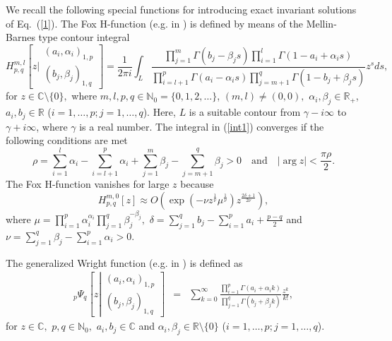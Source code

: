 \documentclass[12pt]{amsart}
\begin{document}
We recall the following special functions for introducing exact invariant solutions of Eq.~(\ref{1}). The Fox H-function (e.g. in \cite{glockle,Kiryakova,Hnom}) is defined by means of the Mellin-Barnes type contour integral
\begin{equation}
\label{int1}
H_{p,q}^{m,l}\left[z\biggr\vert\begin{array}{c}
(a_i, \alpha_i)_{1,p}\\
(b_j, \beta_j)_{1,q}
\end{array}\right]=\frac{1}{2\pi i}\int_{L}\frac{\prod\limits_{j=1}^m\Gamma(b_j-\beta_js)\prod\limits_{i=1}^l\Gamma(1-a_i+\alpha_is)}{\prod\limits_{i=l+1}^p\Gamma(a_i-\alpha_is)\prod\limits_{j=m+1}^q\Gamma(1-b_j+\beta_js)}z^{s}d s,
\end{equation}
for $z\in\mathbb{C}\setminus\{0\},$ where $m,l,p,q\in\mathbb{N}_0=\{0,1,2,\ldots\}$, $(m,l)\neq (0,0),$ $\alpha_i, \beta_j\in\mathbb{R}_+$, $a_i,b_j\in\mathbb{R}$ ($i=1,\ldots, p;j=1,\ldots,q$). Here, $L$ is a suitable contour from $\gamma-i\infty$ to $\gamma+i\infty$, where $\gamma$ is a real number. The integral in (\ref{int1}) converges if the following conditions are met 
\begin{equation*}
\rho=\sum_{i=1}^{l}\alpha_i-\sum_{i=l+1}^{p}\alpha_i+\sum_{j=1}^{m}\beta_j-\sum_{j=m+1}^{q}\beta_j>0\quad\mbox{and}\quad |\arg z|<\frac{\pi\rho}{2}. 
\end{equation*}
The Fox H-function vanishes for large $z$ because 
\begin{equation*}
\label{eq8}
H_{p,q}^{m,0}[z]\approx O\left(\exp\left(-\nu z^{\frac{1}{\nu}}\mu^{\frac{1}{\nu}}\right)z^{\frac{2\delta+1}{2\nu}}\right),
\end{equation*}
where $\mu=\prod\limits_{i=1}^p\alpha_i^{\alpha_i}\prod\limits_{j=1}^q\beta_j^{-\beta_j},$ $\delta=\sum\limits_{j=1}^q b_j-\sum\limits_{i=1}^p a_i+\frac{p-q}{2}$  and
$\nu=\sum\limits_{j=1}^{q}\beta_j-\sum\limits_{i=1}^{p}\alpha_i>0$.

The generalized Wright function (e.g. in \cite{Luchko1,kilb2005}) is defined as
\begin{eqnarray}
\label{ub3}
{}_p\Psi_q\left[z\left|\begin{array}{c}
(a_i,\alpha_i)_{1,p}\\
(b_j,\beta_j)_{1,q}
\end{array}\right.\right] & = & \sum_{k=0}^\infty\frac{\prod\limits_{i=1}^p\Gamma(a_i+\alpha_i k)}{\prod\limits_{j=1}^q\Gamma(b_j+\beta_j k)}\frac{z^k}{k!},
\end{eqnarray}
for $z\in\mathbb{C},$ $p,q\in\mathbb{N}_0,$ $a_i,b_j\in\mathbb{C}$ and $\alpha_i, \beta_j\in\mathbb{R}\setminus\{0\}$ ($i=1,\ldots,p; j=1,\ldots,q$). 
\end{document}
